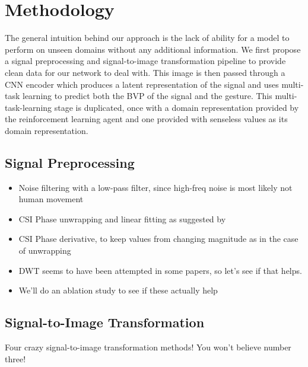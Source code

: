 \chapter{Methodology}\label{chapter:methodology}

The general intuition behind our approach is the lack of ability for a model to perform on unseen domains without any additional information.
We first propose a signal preprocessing and signal-to-image transformation pipeline to provide clean data for our network to deal with. This image is then passed through a CNN encoder which produces a latent representation of the signal and uses multi-task learning to predict both the BVP of the signal and the gesture. This multi-task-learning stage is duplicated, once with a domain representation provided by the reinforcement learning agent and one provided with senseless values as its domain representation.


\section{Signal Preprocessing}\label{sec:methodology-signal-preprocessing}

\begin{itemize}
	\item Noise filtering with a low-pass filter, since high-freq noise is most likely not human movement
	\item CSI Phase unwrapping and linear fitting as suggested by \cite{geng2022densepose}
	\item CSI Phase derivative, to keep values from changing magnitude as in the case of unwrapping
	\item DWT seems to have been attempted in some papers, so let's see if that helps.
	\item We'll do an ablation study to see if these actually help
\end{itemize}

\section{Signal-to-Image Transformation}\label{sec:methodology-signal-to-image}

Four crazy signal-to-image transformation methods! You won't believe number three!

